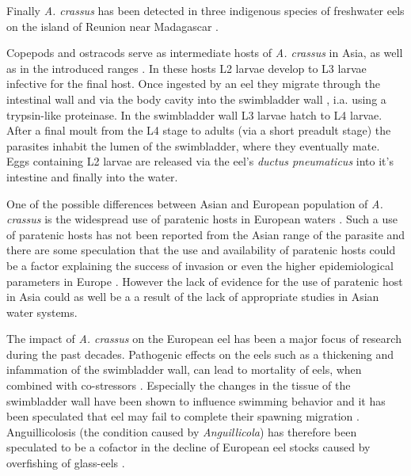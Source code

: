 Finally \textit{A. crassus} has been detected in three indigenous
species of freshwater eels on the island of Reunion near Madagascar
\cite{sasal_parasite_2008}.

Copepods and ostracods serve as intermediate hosts of
\textit{A. crassus} in Asia, as well as in the introduced ranges
\cite{moravec_first_2005}. In these hosts L2 larvae develop to L3
larvae infective for the final host. Once ingested by an eel they
migrate through the intestinal wall and via the body cavity into the
swimbladder wall \cite{haenen_effects_1996}, i.a. using a trypsin-like
proteinase\cite{polzer_identification_1993}. In the swimbladder wall
L3 larvae hatch to L4 larvae. After a final moult from the L4 stage to
adults (via a short preadult stage) the parasites inhabit the lumen of
the swimbladder, where they eventually mate. Eggs containing L2 larvae
are released via the eel's \textit{ductus pneumaticus} into it's intestine
and finally into the water\cite{de_charleroy_life_1990}.


One of the possible differences between Asian and European population
of \textit{A. crassus} is the widespread use of paratenic hosts in
European waters \cite{thomas_paratenic_1992,
  pietrock_dynamics_2002}. Such a use of paratenic hosts has not been
reported from the Asian range of the parasite and there are some
speculation that the use and availability of paratenic hosts could be
a factor explaining the success of invasion or even the higher
epidemiological parameters in Europe
\cite{thomas_paratenic_1992}. However the lack of evidence for the use
of paratenic host in Asia could as well be a a result of the lack of
appropriate studies in Asian water systems.

The impact of \textit{A. crassus} on the European eel has been a major
focus of research during the past decades. Pathogenic effects on the
eels such as a thickening \cite{wurtz_tara_2000} and infammation
\cite{beregi_radiodiagnostic_1998} of the swimbladder wall, can lead
to mortality of eels, when combined with co-stressors
\cite{gollock_physiological_2005}. Especially the changes in the
tissue of the swimbladder wall have been shown to influence swimming
behavior and it has been speculated that eel may fail to complete
their spawning migration \cite{palstra_swimming_2007}. Anguillicolosis
(the condition caused by \textit{Anguillicola}) has therefore been
speculated to be a cofactor in the decline of European eel stocks
\cite{sures_science_letter} caused by overfishing of glass-eels
\cite{pmid12713741}.

